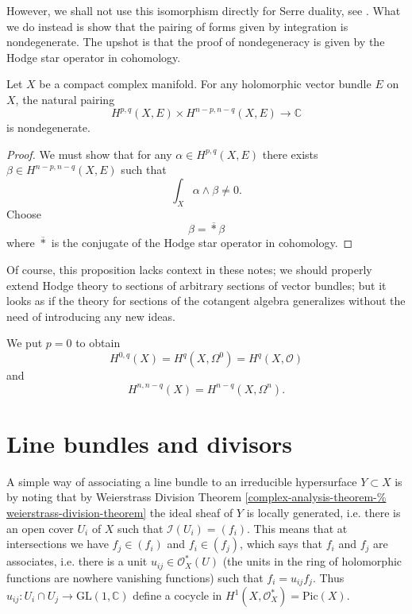\documentclass{book}
\begin{document}
\noindent
However, we shall not use this isomorphism
directly for Serre duality, see \cite[Remark
4.1.17]{huc}. What we do instead is show that
the pairing of forms given by integration is
nondegenerate. The upshot is that the proof
of nondegeneracy is given by the Hodge star
operator in cohomology.

\begin{proposition}
\label{proposition-serre-duality}
\begin{reference}
\cite[Proposition 4.1.15]{huc}
\end{reference}
Let $X$ be a compact complex manifold.
For any holomorphic vector bundle $E$ on $X$,
the natural pairing
$$
H^{p,q}(X,E) \times H^{n-p,n-q}(X,E) \to
\mathbb{C}
$$
is nondegenerate.
\end{proposition}

\begin{proof}
We must show that for any $\alpha \in
H^{p,q}(X,E)$ there exists $\beta \in
H^{n-p,n-q}(X,E)$ such that
$$
\int_X\alpha\wedge \beta\neq 0.
$$
Choose
$$
\beta=\overline{*}\beta
$$
where $\overline{*}$ is the conjugate of the
Hodge star operator in cohomology.
\end{proof}

\noindent
Of course, this proposition lacks context in
these notes; we should properly extend Hodge
theory to sections of arbitrary sections of
vector bundles; but it looks as if the theory
for sections of the cotangent algebra
generalizes without the need of introducing
any new ideas.

We put $p=0$ to obtain
$$
H^{0,q}(X)=H^q(X,\Omega^0)=H^q(X,\mathcal{O})
$$
and
$$
H^{n,n-q}(X)=H^{n-q}(X,\Omega^n).
$$

\section{Line bundles and divisors}
\label{section-line-bundles}

\noindent
A simple way of associating a line bundle to
an irreducible
hypersurface $Y\subset X$ is by noting that
by Weierstrass Division Theorem
\ref{complex-analysis-theorem-%
weierstrass-division-theorem}
the ideal sheaf of $Y$ is locally generated,
i.e. there is an open cover $U_i$ of $X$
such that $\mathcal{I}(U_i)=(f_i)$.
This means that at intersections we have
$f_j \in (f_i)$ and $f_i\in (f_j)$,
which says that $f_i$ and $f_j$ are
associates,
i.e. there is a unit $u_{ij} \in
\mathcal{O}^*_X(U)$
(the units in the ring of holomorphic
functions
are nowhere vanishing functions)
such that $f_i=u_{ij}f_j$.
Thus $u_{ij}:U_i\cap U_j \to
\text{GL}(1,\mathbb{C})$
define a cocycle in $H^1(X,\mathcal{O}^*_X) =
\text{Pic}(X)$.
\end{document}
